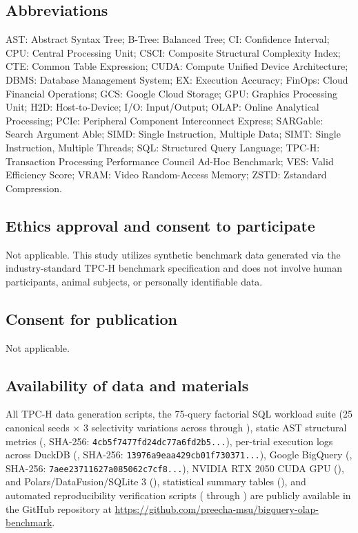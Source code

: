 \documentclass[10pt,a4paper]{article}
\begin{document}
\subsection*{Abbreviations}
AST: Abstract Syntax Tree; B-Tree: Balanced Tree; CI: Confidence Interval; CPU: Central Processing Unit; CSCI: Composite Structural Complexity Index; CTE: Common Table Expression; CUDA: Compute Unified Device Architecture; DBMS: Database Management System; EX: Execution Accuracy; FinOps: Cloud Financial Operations; GCS: Google Cloud Storage; GPU: Graphics Processing Unit; H2D: Host-to-Device; I/O: Input/Output; OLAP: Online Analytical Processing; PCIe: Peripheral Component Interconnect Express; SARGable: Search Argument Able; SIMD: Single Instruction, Multiple Data; SIMT: Single Instruction, Multiple Threads; SQL: Structured Query Language; TPC-H: Transaction Processing Performance Council Ad-Hoc Benchmark; VES: Valid Efficiency Score; VRAM: Video Random-Access Memory; ZSTD: Zstandard Compression.

\subsection*{Ethics approval and consent to participate}
Not applicable. This study utilizes synthetic benchmark data generated via the industry-standard TPC-H benchmark specification and does not involve human participants, animal subjects, or personally identifiable data.

\subsection*{Consent for publication}
Not applicable.

\subsection*{Availability of data and materials}
All TPC-H data generation scripts, the 75-query factorial SQL workload suite (25 canonical seeds $\times$ 3 selectivity variations across  through ), static AST structural metrics (, SHA-256: \texttt{4cb5f7477fd24dc77a6fd2b5...}), per-trial execution logs across DuckDB (, SHA-256: \texttt{13976a9eaa429cb01f730371...}), Google BigQuery (, SHA-256: \texttt{7aee23711627a085062c7cf8...}), NVIDIA RTX 2050 CUDA GPU (), and Polars/DataFusion/SQLite 3 (), statistical summary tables (), and automated reproducibility verification scripts ( through ) are publicly available in the GitHub repository at \url{https://github.com/preecha-msu/bigquery-olap-benchmark}.
\end{document}
